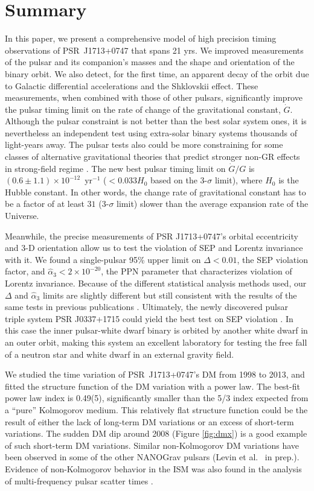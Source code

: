 \section{Summary}
In this paper, we present a comprehensive model of high precision timing observations of
PSR~J1713+0747 that spans 21 yrs. 
We improved measurements of the pulsar and its companion's masses and the
shape and orientation of the binary orbit. We also detect, for the first time, an apparent
decay of the orbit due to Galactic differential accelerations and the Shklovskii effect.
These measurements, when combined with those of other pulsars, 
significantly improve the pulsar timing limit on the rate of change of the gravitational
constant, $\dot{G}$. Although the pulsar constraint is not better than the
best solar system ones, it is nevertheless an independent test using 
extra-solar binary systems thousands of light-years away. The pulsar tests
also could be more constraining for some
classes of alternative gravitational theories that predict stronger non-GR effects in
strong-field regime \citep{wex14}.
The new best pulsar timing limit on $\dot{G}/G$ is 
$(0.6\pm1.1)\times10^{-12}$~yr$^{-1}$ ($<0.033H_0$ based on the 3-$\sigma$ limit), where $H_0$ is the Hubble constant. 
In other words, the change rate of gravitational constant has to be a factor
of at least $31$ (3-$\sigma$ limit) slower than the average expansion rate of
the Universe.

Meanwhile, the precise measurements of PSR J1713+0747's orbital eccentricity and
3-D orientation allow us to test the violation of SEP and 
Lorentz invariance with it. We found a single-pulsar 95\% upper limit on 
$\Delta <0.01$, the SEP violation factor, and
$\hat{\alpha}_3<2\times10^{-20}$, the PPN parameter that characterizes
violation of Lorentz invariance. 
Because of the different statistical analysis methods used, our 
$\Delta$ and $\hat{\alpha}_3$ limits  are slightly
different but still consistent with the results of the same tests in previous publications 
\citep{wex00, sns+05, sfl+05, gsf+11, fkw12}.
Ultimately, the newly discovered pulsar triple system PSR J0337+1715 \citep{rsa+14} 
could yield the best test on SEP violation \citep{fkw12, ssa+15, bbc+15}. In this case 
the inner pulsar-white dwarf binary is orbited by another white dwarf in an
outer orbit, making this system an excellent laboratory for testing
the free fall of a neutron star and white dwarf in an external gravity field.

We studied the time variation of PSR~J1713+0747's DM from 1998 to 2013, and
fitted the structure function of the DM variation with a power law.  
The best-fit power law index is 0.49(5), significantly smaller than the 5/3 
index expected from a ``pure'' Kolmogorov medium. This relatively flat structure
function could be the result of either the lack of long-term DM variations or an
excess of short-term variations. The sudden DM dip around 2008 (Figure
\ref{fig:dmx}) is a good example of such short-term DM variations.
Similar non-Kolmogorov DM variations have been observed in some of the
other NANOGrav pulsars (Levin et al. \ in prep.). Evidence of non-Kolmogorov behavior 
in the ISM was also found in the analysis of multi-frequency pulsar scatter times \citep{lkk15}.

